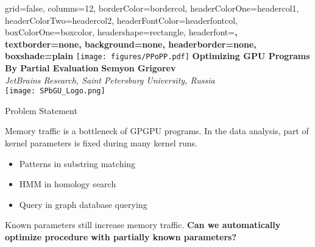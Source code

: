\documentclass[a0paper,portrait]{baposter}
\begin{document}
\setlength{\fboxsep}{0pt}


\begin{poster}{
grid=false,
columns=12, %
borderColor=bordercol, %
headerColorOne=headercol1, %
headerColorTwo=headercol2, %
headerFontColor=headerfontcol, %
boxColorOne=boxcolor, %
headershape=rectangle, %
headerfont=\Large\sf\bf, %
textborder=none,
background=none,
headerborder=none, %
boxshade=plain
}
{\texttt{[image: figures/PPoPP.pdf]}}
%
%
{\bf \huge{Optimizing GPU Programs By Partial Evaluation} }
{\vspace{0.6em} \smaller \textbf{Semyon Grigorev} \\  %
\smaller \it {JetBrains Research, Saint Petersburg University, Russia } \\ %
}
{\texttt{[image: SPbGU\_Logo.png]}} %


\begin{posterbox}[name=CFPQ,column=0,row=0, span=4]{Problem Statement}

  Memory traffic is a bottleneck of GPGPU programs.
  In the data analysis, part of kernel parameters is fixed during many kernel runs.
  \begin{itemize}
    \item Patterns in substring matching
    \item HMM in homology search
    \item Query in graph database querying
  \end{itemize}
  Known parameters still increase memory traffic. \textbf{Can we automatically optimize procedure with partially known parameters?}
\end{posterbox}


\end{poster}
\end{document}
